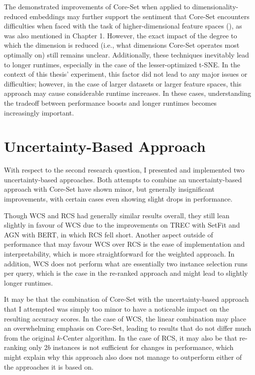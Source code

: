 \documentclass[english,bachelor,ul]{webisthesis} %
\begin{document}
The demonstrated improvements of Core-Set when applied to dimensionality-reduced embeddings may further support the sentiment that Core-Set encounters difficulties when faced with the task of higher-dimensional feature spaces (\cite{DBLP:conf/iccv/SinhaED19}), as was also mentioned in Chapter 1. However, the exact impact of the degree to which the dimension is reduced (i.e., what dimensions Core-Set operates most optimally on) still remains unclear. Additionally, these techniques inevitably lead to longer runtimes, especially in the case of the lesser-optimized t-SNE. In the context of this thesis' experiment, this factor did not lead to any major issues or difficulties; however, in the case of larger datasets or larger feature spaces, this approach may cause considerable runtime increases. In these cases, understanding the tradeoff between performance boosts and longer runtimes becomes increasingly important. 

\section{Uncertainty-Based Approach}

With respect to the second research question, I presented and implemented two uncertainty-based approaches.  
Both attempts to combine an uncertainty-based approach with Core-Set have shown minor, but generally insignificant improvements, with certain cases even showing slight drops in performance. 

Though WCS and RCS had generally similar results overall, they still lean slightly in favour of WCS due to the improvements on TREC with SetFit and AGN with BERT, in which RCS fell short. Another aspect outside of performance that may favour WCS over RCS is the ease of implementation and interpretability, which is more straightforward for the weighted approach. In addition, WCS does not perform what are essentially two instance selection runs per query, which is the case in the re-ranked approach and might lead to slightly longer runtimes. 

It may be that the combination of Core-Set with the uncertainty-based approach that I attempted was simply too minor to have a noticeable impact on the resulting accuracy scores. In the case of WCS, the linear combination may place an overwhelming emphasis on Core-Set, leading to results that do not differ much from the original $k$-Center algorithm. In the case of RCS, it may also be that re-ranking only $2b$ instances is not sufficient for changes in performance, which might explain why this approach also does not manage to outperform either of the approaches it is based on.
\end{document}
